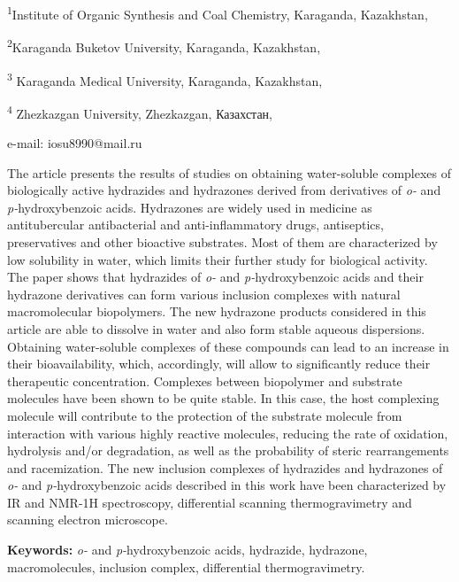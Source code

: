 \textsuperscript{1}Institute of Organic Synthesis and Coal Chemistry,
Karaganda, Kazakhstan,

\textsuperscript{2}Karaganda Buketov University, Karaganda, Kazakhstan,

\textsuperscript{3} Karaganda Medical University, Karaganda, Kazakhstan,

\textsuperscript{4} Zhezkazgan University, Zhezkazgan, Казахстан,

e-mail: iosu8990@mail.ru

The article presents the results of studies on obtaining water-soluble
complexes of biologically active hydrazides and hydrazones derived from
derivatives of \emph{o-} and \emph{p-}hydroxybenzoic acids. Hydrazones
are widely used in medicine as antitubercular antibacterial and
anti-inflammatory drugs, antiseptics, preservatives and other bioactive
substrates. Most of them are characterized by low solubility in water,
which limits their further study for biological activity. The paper
shows that hydrazides of \emph{o-} and \emph{p-}hydroxybenzoic acids and
their hydrazone derivatives can form various inclusion complexes with
natural macromolecular biopolymers. The new hydrazone products
considered in this article are able to dissolve in water and also form
stable aqueous dispersions. Obtaining water-soluble complexes of these
compounds can lead to an increase in their bioavailability, which,
accordingly, will allow to significantly reduce their therapeutic
concentration. Complexes between biopolymer and substrate molecules have
been shown to be quite stable. In this case, the host complexing
molecule will contribute to the protection of the substrate molecule
from interaction with various highly reactive molecules, reducing the
rate of oxidation, hydrolysis and/or degradation, as well as the
probability of steric rearrangements and racemization. The new inclusion
complexes of hydrazides and hydrazones of \emph{o-} and
\emph{p-}hydroxybenzoic acids described in this work have been
characterized by IR and NMR-1H spectroscopy, differential scanning
thermogravimetry and scanning electron microscope.

{\bfseries Keywords:} \emph{o-} and \emph{p-}hydroxybenzoic acids,
hydrazide, hydrazone, macromolecules, inclusion complex, differential
thermogravimetry.

